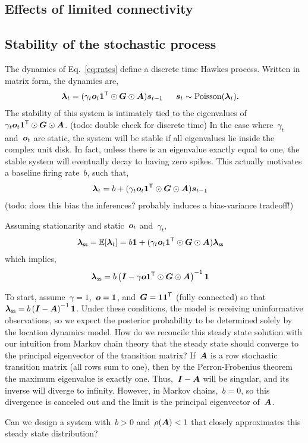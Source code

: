 \subsection{Effects of limited connectivity}

\subsection{Stability of the stochastic process}
The dynamics of Eq.~\ref{eq:rates} define a discrete time Hawkes process.
Written in matrix form, the dynamics are,
\begin{align}
  \boldsymbol{\lambda}_t &= (\gamma_t \boldsymbol{o}_t \boldsymbol{1}^{\mathsf{T}} \odot \boldsymbol{G} \odot \boldsymbol{A}) \boldsymbol{s}_{t-1}
  \; & \;
  \boldsymbol{s}_t &\sim \mathrm{Poisson}(\boldsymbol{\lambda}_t).
\end{align}
The stability of this system is intimately tied to the eigenvalues
of~${\gamma_t \boldsymbol{o}_t \boldsymbol{1}^{\mathsf{T}} \odot \boldsymbol{G} \odot \boldsymbol{A}}$.
(todo: double check for discrete time) In the case where~$\gamma_t$
and~$\boldsymbol{o}_t$ are static, the system will be stable if all eigenvalues lie
inside the complex unit disk. In fact, unless there is an eigenvalue
exactly equal to one, the stable system will eventually decay to having
zero spikes. This actually motivates a baseline firing rate~$b$, such that,
\begin{align}
    \boldsymbol{\lambda}_t &= b + (\gamma_t \boldsymbol{o}_t \boldsymbol{1}^{\mathsf{T}} \odot \boldsymbol{G} \odot \boldsymbol{A}) \boldsymbol{s}_{t-1}
\end{align}
(todo: does this bias the inferences? probably induces a bias-variance tradeoff!)

Assuming stationarity and static~$\boldsymbol{o}_t$ and~$\gamma_t$,
\begin{align}
  \boldsymbol{\lambda}_{\textsf{ss}} &= \mathbb{E}[\boldsymbol{\lambda}_t] 
  = b\boldsymbol{1} + (\gamma_t \boldsymbol{o}_t \boldsymbol{1}^{\mathsf{T}} \odot \boldsymbol{G} \odot \boldsymbol{A}) \boldsymbol{\lambda}_{\textsf{ss}}
\end{align}
which implies,
\begin{align}
  \boldsymbol{\lambda}_{\textsf{ss}} &=
  b \left( \boldsymbol{I} - \gamma \boldsymbol{o} \boldsymbol{1}^{\mathsf{T}} \odot \boldsymbol{G} \odot \boldsymbol{A} \right)^{-1} \boldsymbol{1}
\end{align}

To start, assume~$\gamma=1$,~$\boldsymbol{o}=\boldsymbol{1}$,
and~${\boldsymbol{G} = \boldsymbol{1}\boldsymbol{1}^{\mathsf{T}}}$ (fully connected) so that
${\boldsymbol{\lambda}_{\textsf{ss}} = b \left( \boldsymbol{I} - \boldsymbol{A} \right)^{-1} \boldsymbol{1}}$.
Under these conditions, the model is receiving uninformative
observations, so we expect the posterior probability to be determined
solely by the location dynamics model. How do we reconcile this 
steady state solution with our intuition from Markov chain 
theory that the steady state should converge to the principal 
eigenvector of the transition matrix? If~$\boldsymbol{A}$ is a row 
stochastic transition matrix (all rows sum to one), 
then by the Perron-Frobenius theorem the maximum eigenvalue is 
exactly one. Thus,~$\boldsymbol{I} - \boldsymbol{A}$ will be singular, and its inverse 
will diverge to infinity. However, in Markov chains,~$b=0$, 
so this divergence is canceled out and the limit is 
the principal eigenvector of~$\boldsymbol{A}$.

Can we design a system with~$b>0$ and~$\rho(\boldsymbol{A})<1$ that closely 
approximates this steady state distribution? 
